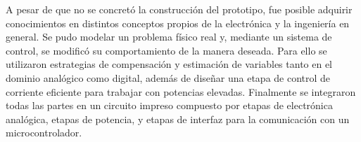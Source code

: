 A pesar de que no se concretó la construcción del prototipo, fue posible adquirir conocimientos en distintos conceptos propios de la electrónica y la ingeniería en general. Se pudo modelar un problema físico real y, mediante un sistema de control, se modificó su comportamiento de la manera deseada. Para ello se utilizaron estrategias de compensación y estimación de variables tanto en el dominio analógico como digital, además de diseñar una etapa de control de corriente eficiente para trabajar con potencias elevadas. Finalmente se integraron todas las partes en un circuito impreso compuesto por etapas de electrónica analógica, etapas de potencia, y etapas de interfaz para la comunicación con un microcontrolador.






%
%
%
%
%
%
%
%
